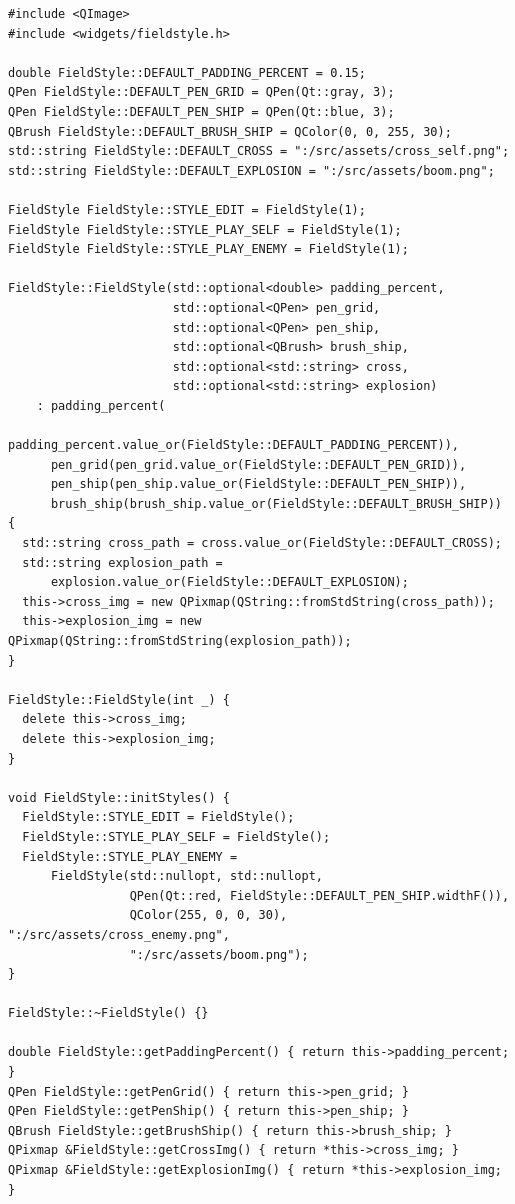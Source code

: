 \documentclass[a4paper,14pt]{extarticle}
\begin{document}
\begin{verbatim}
#include <QImage>
#include <widgets/fieldstyle.h>

double FieldStyle::DEFAULT_PADDING_PERCENT = 0.15;
QPen FieldStyle::DEFAULT_PEN_GRID = QPen(Qt::gray, 3);
QPen FieldStyle::DEFAULT_PEN_SHIP = QPen(Qt::blue, 3);
QBrush FieldStyle::DEFAULT_BRUSH_SHIP = QColor(0, 0, 255, 30);
std::string FieldStyle::DEFAULT_CROSS = ":/src/assets/cross_self.png";
std::string FieldStyle::DEFAULT_EXPLOSION = ":/src/assets/boom.png";

FieldStyle FieldStyle::STYLE_EDIT = FieldStyle(1);
FieldStyle FieldStyle::STYLE_PLAY_SELF = FieldStyle(1);
FieldStyle FieldStyle::STYLE_PLAY_ENEMY = FieldStyle(1);

FieldStyle::FieldStyle(std::optional<double> padding_percent,
                       std::optional<QPen> pen_grid,
                       std::optional<QPen> pen_ship,
                       std::optional<QBrush> brush_ship,
                       std::optional<std::string> cross,
                       std::optional<std::string> explosion)
    : padding_percent(
          padding_percent.value_or(FieldStyle::DEFAULT_PADDING_PERCENT)),
      pen_grid(pen_grid.value_or(FieldStyle::DEFAULT_PEN_GRID)),
      pen_ship(pen_ship.value_or(FieldStyle::DEFAULT_PEN_SHIP)),
      brush_ship(brush_ship.value_or(FieldStyle::DEFAULT_BRUSH_SHIP)) {
  std::string cross_path = cross.value_or(FieldStyle::DEFAULT_CROSS);
  std::string explosion_path =
      explosion.value_or(FieldStyle::DEFAULT_EXPLOSION);
  this->cross_img = new QPixmap(QString::fromStdString(cross_path));
  this->explosion_img = new QPixmap(QString::fromStdString(explosion_path));
}

FieldStyle::FieldStyle(int _) {
  delete this->cross_img;
  delete this->explosion_img;
}

void FieldStyle::initStyles() {
  FieldStyle::STYLE_EDIT = FieldStyle();
  FieldStyle::STYLE_PLAY_SELF = FieldStyle();
  FieldStyle::STYLE_PLAY_ENEMY =
      FieldStyle(std::nullopt, std::nullopt,
                 QPen(Qt::red, FieldStyle::DEFAULT_PEN_SHIP.widthF()),
                 QColor(255, 0, 0, 30), ":/src/assets/cross_enemy.png",
                 ":/src/assets/boom.png");
}

FieldStyle::~FieldStyle() {}

double FieldStyle::getPaddingPercent() { return this->padding_percent; }
QPen FieldStyle::getPenGrid() { return this->pen_grid; }
QPen FieldStyle::getPenShip() { return this->pen_ship; }
QBrush FieldStyle::getBrushShip() { return this->brush_ship; }
QPixmap &FieldStyle::getCrossImg() { return *this->cross_img; }
QPixmap &FieldStyle::getExplosionImg() { return *this->explosion_img; }

\end{verbatim}
\end{document}
